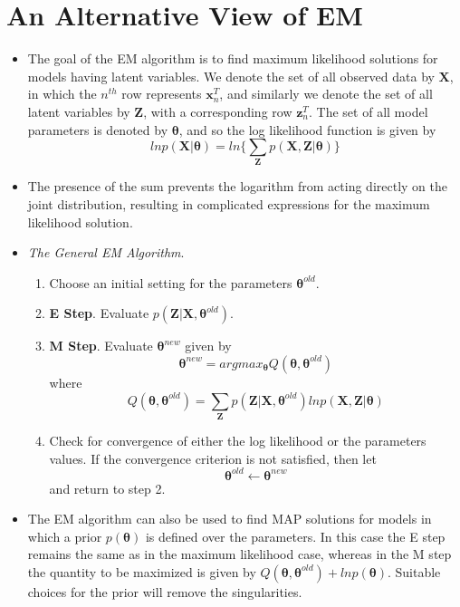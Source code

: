 \documentclass[12pt, a4paper]{article}
\begin{document}
    \section{An Alternative View of EM}
    \begin{itemize}
        \item The goal of the EM algorithm is to find maximum likelihood solutions for 
        models having latent variables. We denote the set of all observed data by 
        $\mathbf{X}$, in which the $n^{th}$ row represents $\bm{x}_n^T$, and similarly
        we denote the set of all latent variables by $\mathbf{Z}$, with a corresponding
        row $\bm{z}_n^T$. The set of all model parameters is denoted by $\bm{\theta}$, 
        and so the log likelihood function is given by
        \begin{equation}
            ln p(\mathbf{X}|\bm{\theta})=ln\Big\{\sum_{\mathbf{Z}}p(\mathbf{X},
            \mathbf{Z}|\bm{\theta}) \Big\}
        \end{equation}
        \item The presence of the sum prevents the logarithm from acting directly on the 
        joint distribution, resulting in complicated expressions for the maximum likelihood
        solution. 
        \item \textit{The General EM Algorithm}. \begin{enumerate}
            \item Choose an initial setting for the parameters $\bm{\theta}^{old}$.
            \item \textbf{E Step}. Evaluate $p(\mathbf{Z}|\mathbf{X},\bm{\theta}^{old})$.
            \item \textbf{M Step}. Evaluate $\bm{\theta}^{new}$ given by 
            \begin{equation*}
                \bm{\theta}^{new}=argmax_{\bm{\theta}} Q(\bm{\theta},\bm{\theta}^{old})
            \end{equation*}
            where \begin{equation*}
                Q(\bm{\theta},\bm{\theta}^{old})=\sum_{\mathbf{Z}}p(\mathbf{Z}|\mathbf{X},
                \bm{\theta}^{old})ln p(\mathbf{X},\mathbf{Z}|\bm{\theta})
            \end{equation*}
            \item Check for convergence of either the log likelihood or the parameters values.
            If the convergence criterion is not satisfied, then let
            \begin{equation*}
                \bm{\theta}^{old}\leftarrow\bm{\theta}^{new}
            \end{equation*}
            and return to step 2. 
        \end{enumerate}
        \item The EM algorithm can also be used to find MAP solutions for models in which a 
        prior $p(\bm{\theta})$ is defined over the parameters. In this case the E step remains
        the same as in the maximum likelihood case, whereas in the M step the quantity to be 
        maximized is given by $Q(\bm{\theta},\bm{\theta}^{old})+lnp(\bm{\theta})$. Suitable 
        choices for the prior will remove the singularities. 
    \end{itemize}
\end{document}
